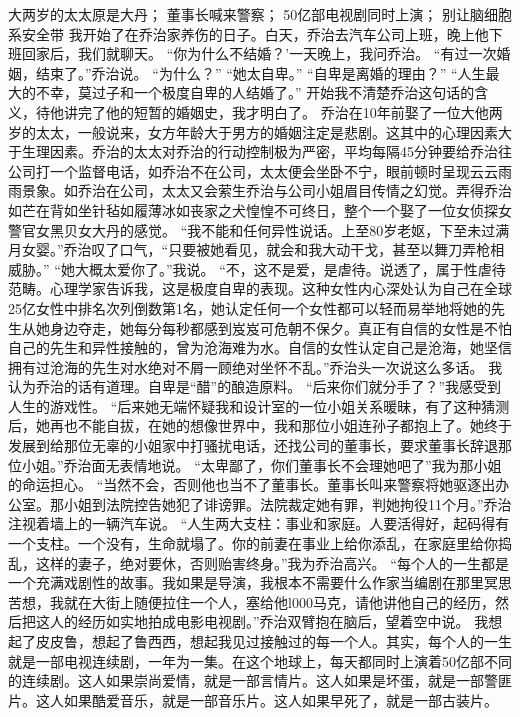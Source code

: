 \documentclass[a4paper,12pt,UTF8,twoside]{ctexbook}
\begin{document}
        大两岁的太太原是大丹； 
        董事长喊来警察； 
        50亿部电视剧同时上演； 
        别让脑细胞系安全带   
        我开始了在乔治家养伤的日子。白天，乔治去汽车公司上班，晚上他下班回家后，我们就聊天。 
        “你为什么不结婚？’一天晚上，我问乔治。 
        “有过一次婚姻，结束了。”乔治说。 
        “为什么？” 
        “她太自卑。” 
        “自卑是离婚的理由？” 
        “人生最大的不幸，莫过子和一个极度自卑的人结婚了。” 
        开始我不清楚乔治这句话的含义，待他讲完了他的短暂的婚姻史，我才明白了。 
        乔治在10年前娶了一位大他两岁的太太，一般说来，女方年龄大于男方的婚姻注定是悲剧。这其中的心理因素大于生理因素。乔治的太太对乔治的行动控制极为严密，平均每隔45分钟要给乔治往公司打一个监督电话，如乔治不在公司，太太便会坐卧不宁，眼前顿时呈现云云雨雨景象。如乔治在公司，太太又会萦生乔治与公司小姐眉目传情之幻觉。弄得乔治如芒在背如坐针毡如履薄冰如丧家之犬惶惶不可终日，整个一个娶了一位女侦探女警官女黑贝女大丹的感觉。 
        “我不能和任何异性说话。上至80岁老妪，下至未过满月女婴。”乔治叹了口气，“只要被她看见，就会和我大动干戈，甚至以舞刀弄枪相威胁。” 
        “她大概太爱你了。”我说。 
        “不，这不是爱，是虐待。说透了，属于性虐待范畴。心理学家告诉我，这是极度自卑的表现。这种女性内心深处认为自己在全球25亿女性中排名次列倒数第1名，她认定任何一个女性都可以轻而易举地将她的先生从她身边夺走，她每分每秒都感到岌岌可危朝不保夕。真正有自信的女性是不怕自己的先生和异性接触的，曾为沧海难为水。自信的女性认定自己是沧海，她坚信拥有过沧海的先生对水绝对不屑一顾绝对坐怀不乱。”乔治头一次说这么多话。 
        我认为乔治的话有道理。自卑是“醋”的酿造原料。 
        “后来你们就分手了？”我感受到人生的游戏性。 
        “后来她无端怀疑我和设计室的一位小姐关系暖昧，有了这种猜测后，她再也不能自拔，在她的想像世界中，我和那位小姐连孙子都抱上了。她终于发展到给那位无辜的小姐家中打骚扰电话，还找公司的董事长，要求董事长辞退那位小姐。”乔治面无表情地说。 
        “太卑鄙了，你们董事长不会理她吧了”我为那小姐的命运担心。 
        “当然不会，否则他也当不了董事长。董事长叫来警察将她驱逐出办公室。那小姐到法院控告她犯了诽谤罪。法院裁定她有罪，判她拘役11个月。”乔治注视着墙上的一辆汽车说。 
        “人生两大支柱：事业和家庭。人要活得好，起码得有一个支柱。一个没有，生命就塌了。你的前妻在事业上给你添乱，在家庭里给你捣乱，这样的妻子，绝对要休，否则贻害终身。”我为乔治高兴。 
        “每个人的一生都是一个充满戏剧性的故事。我如果是导演，我根本不需要什么作家当编剧在那里冥思苦想，我就在大街上随便拉住一个人，塞给他l000马克，请他讲他自己的经历，然后把这人的经历如实地拍成电影电视剧。”乔治双臂抱在脑后，望着空中说。 
        我想起了皮皮鲁，想起了鲁西西，想起我见过接触过的每一个人。其实，每个人的一生就是一部电视连续剧，一年为一集。在这个地球上，每天都同时上演着50亿部不同的连续剧。这人如果崇尚爱情，就是一部言情片。这人如果是坏蛋，就是一部警匪片。这人如果酷爱音乐，就是一部音乐片。这人如果早死了，就是一部古装片。 
\end{document}
